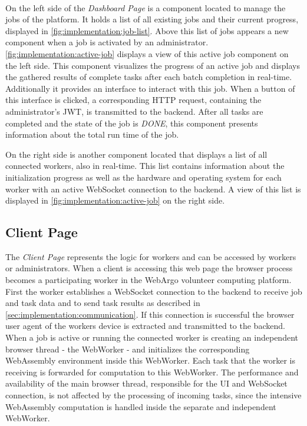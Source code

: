 ~\\
On the left side of the \emph{Dashboard Page} is a component located to manage the jobs of the platform. It holds a list of all existing jobs and their current progress, displayed in \autoref{fig:implementation:job-list}. Above this list of jobs appears a new component when a job is activated by an administrator.
~\\
\autoref{fig:implementation:active-job} displays a view of this active job component on the left side. This component visualizes the progress of an active job and displays the gathered results of complete tasks after each batch completion in real-time. Additionally it provides an interface to interact with this job. When a button of this interface is clicked, a corresponding \acs{HTTP} request, containing the administrator's \ac{JWT}, is transmitted to the backend. After all tasks are completed and the state of the job is \emph{DONE}, this component presents information about the total run time of the job. 

On the right side is another component located that displays a list of all connected workers, also in real-time. This list contains information about the initialization progress as well as the hardware and operating system for each worker with an active WebSocket connection to the backend. A view of this list is displayed in \autoref{fig:implementation:active-job} on the right side.

\subsection{Client Page}
\label{subsec:implementation:client-page}
The \emph{Client Page} represents the logic for workers and can be accessed by workers or administrators. When a client is accessing this web page the browser process becomes a participating worker in the WebArgo volunteer computing platform. First the worker establishes a WebSocket connection to the backend to receive job and task data and to send task results as described in \autoref{sec:implementation:communication}. If this connection is successful the browser user agent of the workers device is extracted and transmitted to the backend. When a job is active or running the connected worker is creating an independent browser thread - the WebWorker - and initializes the corresponding WebAssembly environment inside this WebWorker. Each task that the worker is receiving is forwarded for computation to this WebWorker. The performance and availability of the main browser thread, responsible for the \ac{UI} and WebSocket connection, is not affected by the processing of incoming tasks, since the intensive WebAssembly computation is handled inside the separate and independent WebWorker.

